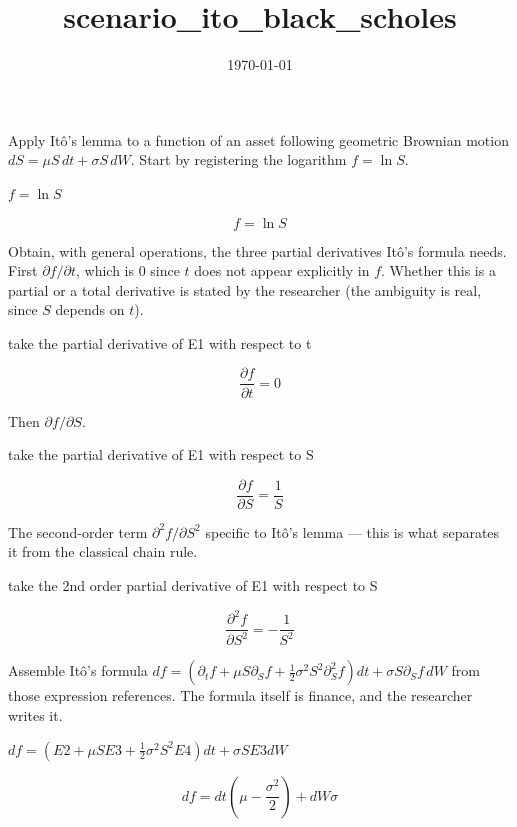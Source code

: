 \documentclass[dvipdfmx]{article}
\title{scenario\_ito\_black\_scholes}
\date{\today}
\begin{document}
\maketitle

Apply Itô's lemma to a function of an asset following geometric Brownian motion $dS=\mu S\,dt+\sigma S\,dW$. Start by registering the logarithm $f=\ln S$.

$f = \ln S$

\begin{equation}
  f = \ln S
  \label{eq:E1}
\end{equation}

Obtain, with general operations, the three partial derivatives Itô's formula needs. First $\partial f/\partial t$, which is 0 since $t$ does not appear explicitly in $f$. Whether this is a partial or a total derivative is stated by the researcher (the ambiguity is real, since $S$ depends on $t$).

take the partial derivative of E1 with respect to t

\begin{equation}
  \frac{\partial f}{\partial t} = 0
  \label{eq:E2}
\end{equation}

Then $\partial f/\partial S$.

take the partial derivative of E1 with respect to S

\begin{equation}
  \frac{\partial f}{\partial S} = \frac{1}{S}
  \label{eq:E3}
\end{equation}

The second-order term $\partial^2 f/\partial S^2$ specific to Itô's lemma — this is what separates it from the classical chain rule.

take the 2nd order partial derivative of E1 with respect to S

\begin{equation}
  \frac{\partial^{2} f}{\partial S^{2}} = -\frac{1}{S^2}
  \label{eq:E4}
\end{equation}

Assemble Itô's formula $df=(\partial_t f+\mu S\partial_S f+\frac12\sigma^2S^2\partial_S^2 f)dt+\sigma S\partial_S f\,dW$ from those expression references. The formula itself is finance, and the researcher writes it.

$df = (E2 + \mu S E3 + \frac{1}{2}\sigma^2 S^2 E4) dt + \sigma S E3 dW$

\begin{equation}
  df=dt \left(\mu-\frac{\sigma^2}{2}\right)+dW \sigma
  \label{eq:E5}
\end{equation}
\end{document}
